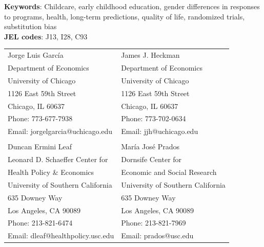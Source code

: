 \noindent \textbf{Keywords}: Childcare, early childhood education, gender differences in responses to programs, health, long-term predictions, quality of life, randomized trials, substitution bias \\
\noindent \textbf{JEL codes}: J13, I28, C93\\


\bigskip
\begin{tabular}{ll}
Jorge Luis Garc\'{i}a                                       & James J. Heckman \\
Department of Economics                                & Department of Economics \\
University of Chicago                                       & University of Chicago \\
1126 East 59th Street                                     & 1126 East 59th Street \\
Chicago, IL 60637                                           & Chicago, IL 60637 \\
Phone: 773-677-7938                                     & Phone: 773-702-0634  \\
Email: jorgelgarcia@uchicago.edu                       & Email: jjh@uchicago.edu \\
                                                                       & \\
Duncan Ermini Leaf                                           & Mar\'{i}a Jos\'{e} Prados \\
Leonard D. Schaeffer Center for            & Dornsife Center for  \\
Health Policy \& Economics                                          & Economic and Social Research \\
University of Southern California                        & University of Southern California \\
635 Downey Way                                             & 635 Downey Way        \\
Los Angeles, CA 90089                                    & Los Angeles, CA 90089 \\
Phone: 213-821-6474                                     & Phone: 213-821-7969 \\
Email: dleaf@healthpolicy.usc.edu                     & Email: prados@usc.edu \\

\end{tabular}

\clearpage

